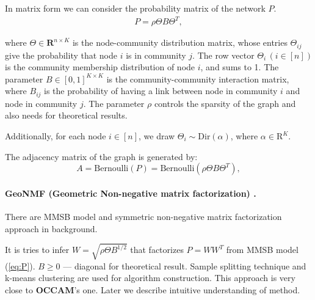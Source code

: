 \documentclass{ITaSconf}
\begin{document}
	In matrix form we can consider the probability matrix of the network $P$. 
	\begin{align}
	\label{eq:P}
	P = \rho \Theta B \Theta^T,
	\end{align}
	
	where $\Theta \in \mathbf{R}^{n\times K}$ is the node-community distribution matrix, whose entries $\Theta_{ij}$ give the probability that node $i$ is in community $j$. The row vector $\Theta_i \, (i ∈ [n]) $ is the community membership distribution of node $i$, and sums to 1. The parameter $B \in [0, 1]^{K\times K}$ is the community-community interaction matrix, where $B_{ij}$ is the probability of having a link between node in community $i$ and node in community $j$. The parameter $\rho$ controls the sparsity of the graph and also needs for theoretical results. 
	
	Additionally, for each node $i \in [n]$, we draw $\Theta_i \sim \mathrm{Dir}(\alpha)$, where $\alpha \in \mathrm{R}^{K}$.
	
	The adjacency matrix of the graph is generated by: 
	$$
	A = \mathrm{Bernoulli}(P) = \mathrm{Bernoulli}(\rho \Theta B \Theta^T),
	$$
	
	\paragraph{GeoNMF (Geometric Non-negative matrix factorization) \cite{mao201GeoNMF}.} There are MMSB model and symmetric non-negative matrix factorization approach in background.
	
	It is tries to infer $W = \sqrt{\rho \Theta B^{1/2}}$ that factorizes $P=W W^T$ from MMSB model (\ref{eq:P}).
	$B \ge 0$ --- diagonal for theoretical result. Sample splitting technique \cite{mcsherry2001spectral}  and k-means clustering are used for algorithm construction. This approach is very close to \textbf{OCCAM}'s one. Later we describe intuitive understanding of method.\\
	
\end{document}
